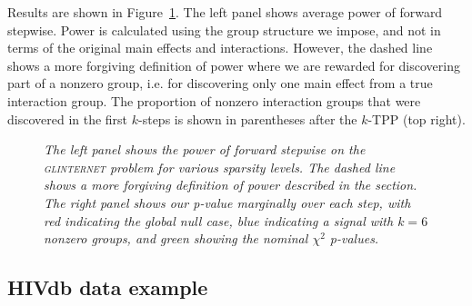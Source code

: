 \documentclass{imsart}
\begin{document}
Results are shown in Figure~\ref{fig:glint}. The left
panel shows average power of forward stepwise. Power is calculated
using the group structure we impose, and not in terms of the original
main effects and interactions. However, the dashed line shows a more
forgiving definition of power where we are rewarded for discovering part
of a nonzero group, i.e. for discovering only one main effect from a
true interaction group. The proportion of nonzero interaction groups
that were discovered in the first $k$-steps is shown in parentheses
after the $k$-TPP (top right).

\begin{figure}
\begin{center}
\hspace{-15pt}
\caption{\small \it The left panel shows the power of forward stepwise
on the \textsc{glinternet} problem
for various sparsity levels. The dashed line shows a more forgiving
definition of power described in the section.
The right panel shows our p-value marginally
over each step, with red indicating the global null case, blue
indicating a signal with $k=6$ nonzero groups, and green showing
the nominal $\chi^2$ p-values.}
\label{fig:glint}
\end{center}
\end{figure}



\subsection{HIVdb data example}
\label{sec:hiv}
\end{document}
